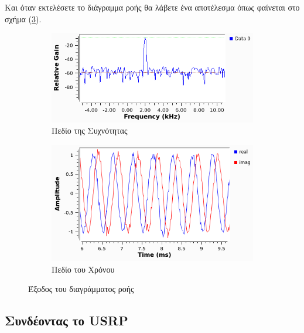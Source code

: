 \documentclass[12pt]{report}
\begin{document}
            Και όταν εκτελέσετε το διάγραμμα ροής θα λάβετε ένα αποτέλεσμα όπως φαίνεται στο 
            σχήμα (\ref{img:ex2}).
            \begin{figure}[h]
                \centering
                \begin{subfigure}{0.45\linewidth}
                    \includegraphics[width=\linewidth]{ex2_freq.png}
                    \caption{Πεδίο της Συχνότητας}
                    \label{img:ex2Freq}
                \end{subfigure}
                \begin{subfigure}{0.45\linewidth}
                    \includegraphics[width=\linewidth]{ex2_time.png}
                    \caption{Πεδίο του Χρόνου}
                    \label{img:ex2Time}
                \end{subfigure}

                \caption{Έξοδος του διαγράμματος ροής}
                \label{img:ex2}
            \end{figure}

        \subsection{\textsf{Συνδέοντας το USRP}}
\end{document}
